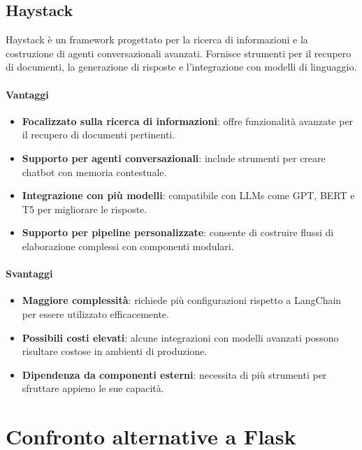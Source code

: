 \documentclass{article}
\begin{document}
\subsection{Haystack}
Haystack è un framework progettato per la ricerca di informazioni e la costruzione di agenti conversazionali avanzati. 
Fornisce strumenti per il recupero di documenti, la generazione di risposte e l'integrazione con modelli di linguaggio.

\paragraph*{Vantaggi}
\begin{itemize}
    \item \textbf{Focalizzato sulla ricerca di informazioni}: offre funzionalità avanzate per il recupero di documenti pertinenti.
    \item \textbf{Supporto per agenti conversazionali}: include strumenti per creare chatbot con memoria contestuale.
    \item \textbf{Integrazione con più modelli}: compatibile con LLMs come GPT, BERT e T5 per migliorare le risposte.
    \item \textbf{Supporto per pipeline personalizzate}: consente di costruire flussi di elaborazione complessi con componenti modulari.
\end{itemize}

\paragraph*{Svantaggi}
\begin{itemize}
    \item \textbf{Maggiore complessità}: richiede più configurazioni rispetto a LangChain per essere utilizzato efficacemente.
    \item \textbf{Possibili costi elevati}: alcune integrazioni con modelli avanzati possono risultare costose in ambienti di produzione.
    \item \textbf{Dipendenza da componenti esterni}: necessita di più strumenti per sfruttare appieno le sue capacità.
\end{itemize}

\section{Confronto alternative a Flask}
\end{document}
